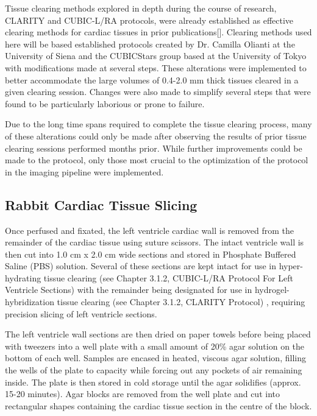 Tissue clearing methods explored in depth during the course of research, CLARITY and CUBIC-L/RA protocols, were already established as effective clearing methods for cardiac tissues in prior publications[]. Clearing methods used here will be based established protocols created by Dr. Camilla Olianti at the University of Siena and the CUBICStars group based at the University of Tokyo with modifications made at several steps. These alterations were implemented to better accommodate the large volumes of 0.4-2.0 mm thick tissues cleared in a given clearing session. Changes were also made to simplify several steps that were found to be particularly laborious or prone to failure.

Due to the long time spans required to complete the tissue clearing process, many of these alterations could only be made after observing the results of prior tissue clearing sessions performed months prior. While further improvements could be made to the protocol, only those most crucial to the optimization of the protocol in the imaging pipeline were implemented.

\subsection{Rabbit Cardiac Tissue Slicing}

Once perfused and fixated, the left ventricle cardiac wall is removed from the remainder of the cardiac tissue using suture scissors. The intact ventricle wall is then cut into 1.0 cm x 2.0 cm wide sections and stored in Phosphate Buffered Saline (PBS) solution. Several of these sections are kept intact for use in hyper-hydrating tissue clearing (see Chapter 3.1.2, CUBIC-L/RA Protocol For Left Ventricle Sections) with the remainder being designated for use in hydrogel-hybridization tissue clearing (see Chapter 3.1.2, CLARITY Protocol) , requiring precision slicing of left ventricle sections.

The left ventricle wall sections are then dried on paper towels before being placed with tweezers into a well plate with a small amount of 20\% agar solution on the bottom of each well. Samples are encased in heated, viscous agar solution, filling the wells of the plate to capacity while forcing out any pockets of air remaining inside. The plate is then stored in cold storage until the agar solidifies (approx. 15-20 minutes). Agar blocks are removed from the well plate and cut into rectangular shapes containing the cardiac tissue section in the centre of the block. 

